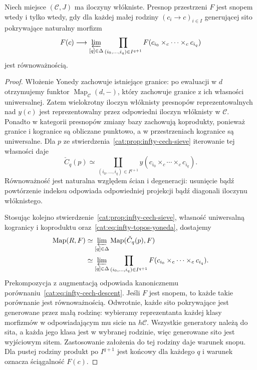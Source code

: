 \begin{twierdzenie}\label{cat:thm:infty-cech-descent}
Niech miejsce $(\mathcal C,J)$ ma iloczyny włókniste. Presnop przestrzeni $F$ jest snopem wtedy i tylko wtedy, gdy dla każdej małej rodziny $(c_i\to c)_{i\in I}$ generującej sito pokrywające naturalny morfizm
\begin{equation}\label{cat:eq:infty-cech-descent}
 F(c)\longrightarrow
 \varprojlim_{[q]\in\Delta}
 \prod_{(i_0,\ldots,i_q)\in I^{q+1}}
 F(c_{i_0}\times_c\cdots\times_c c_{i_q})
\end{equation}
jest równoważnością.
\end{twierdzenie}
\begin{proof}
Włożenie Yonedy zachowuje istniejące granice: po ewaluacji w $d$ otrzymujemy funktor $\operatorname{Map}_{\mathcal C}(d,-)$, który zachowuje granice z ich własności uniwersalnej. Zatem wielokrotny iloczyn włóknisty presnopów reprezentowalnych nad $y(c)$ jest reprezentowalny przez odpowiedni iloczyn włóknisty w $\mathcal C$. Ponadto w kategorii presnopów zmiany bazy zachowują koprodukty, ponieważ granice i kogranice są obliczane punktowo, a w przestrzeniach kogranice są uniwersalne. Dla $p$ ze stwierdzenia~\ref{cat:prop:infty-cech-sieve} iterowanie tej własności daje
\[
 \check C_q(p)\simeq
 \coprod_{(i_0,\ldots,i_q)\in I^{q+1}}
 y(c_{i_0}\times_c\cdots\times_c c_{i_q}).
\]
Równoważność jest naturalna względem ścian i degeneracji: usunięcie bądź powtórzenie indeksu odpowiada odpowiedniej projekcji bądź diagonali iloczynu włóknistego.

Stosując kolejno stwierdzenie~\ref{cat:prop:infty-cech-sieve}, własność uniwersalną kogranicy i koproduktu oraz~\eqref{cat:eq:infty-topos-yoneda}, dostajemy
\[
\begin{aligned}
 \operatorname{Map}(R,F)
 &\simeq\varprojlim_{[q]\in\Delta}\operatorname{Map}(\check C_q(p),F)\\
 &\simeq\varprojlim_{[q]\in\Delta}
 \prod_{(i_0,\ldots,i_q)\in I^{q+1}}
 F(c_{i_0}\times_c\cdots\times_c c_{i_q}).
\end{aligned}
\]
Prekompozycja z augmentacją odpowiada kanonicznemu porównaniu~\eqref{cat:eq:infty-cech-descent}. Jeśli $F$ jest snopem, to każde takie porównanie jest równoważnością. Odwrotnie, każde sito pokrywające jest generowane przez małą rodzinę: wybieramy reprezentanta każdej klasy morfizmów w odpowiadającym mu sicie na $h\mathcal C$. Wszystkie generatory należą do sita, a każda jego klasa jest w wybranej rodzinie, więc generowane sito jest wyjściowym sitem. Zastosowanie założenia do tej rodziny daje warunek snopu. Dla pustej rodziny produkt po $I^{q+1}$ jest końcowy dla każdego $q$ i warunek oznacza ściągalność $F(c)$.
\end{proof}

